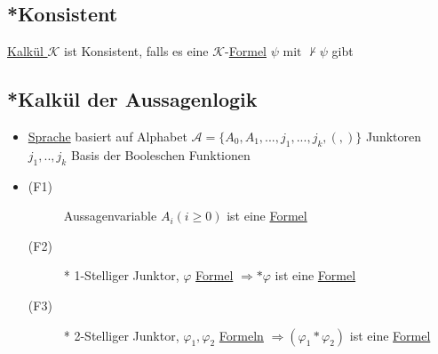 \documentclass[12pt,a4paper]{article} %
\begin{document}
	\subsection{*Konsistent}
	\label{ALKonsistent}
	\hyperref[Kalkul]{Kalkül $\mathcal{K}$} ist Konsistent, falls es eine $\mathcal{K}$-\hyperref[Formel]{Formel} $\psi \text{ mit } \nvdash \psi$ gibt
	
	\subsection{*Kalkül der Aussagenlogik}
	\begin{itemize}
		\item \hyperref[Sprache]{Sprache} basiert auf Alphabet $\mathcal{A} = \{A_0, A_1, ..., j_1, ..., j_k, (, )\}$ Junktoren $j_1, .., j_k$ Basis der Booleschen Funktionen
		\item \begin{description}
			\item[(F1)] Aussagenvariable $A_i (i \ge 0)$ ist eine \hyperref[Formel]{Formel} 
			\item[(F2)] * 1-Stelliger Junktor, $\varphi$ \hyperref[Formel]{Formel} $\Rightarrow *\varphi$ ist eine \hyperref[Formel]{Formel}
			\item[(F3)] * 2-Stelliger Junktor, $\varphi_1, \varphi_2$ \hyperref[Formel]{Formeln} $\Rightarrow (\varphi_1 * \varphi_2)$ ist eine \hyperref[Formel]{Formel}
		\end{description}
	\end{itemize}
\end{document}
